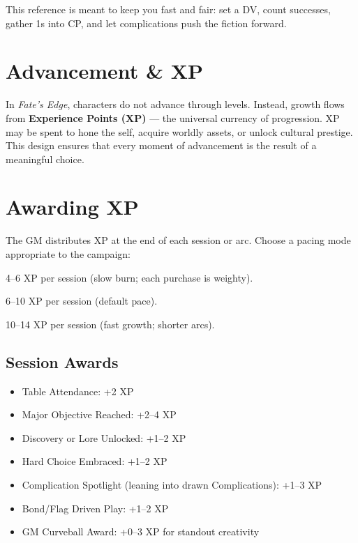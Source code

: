 \documentclass[12pt]{article}
\begin{document}
\bigskip
\noindent This reference is meant to keep you fast and fair: set a DV, count successes, gather 1s into CP, and let complications push the fiction forward.

\section{Advancement \& XP}

In \textit{Fate’s Edge}, characters do not advance through levels. 
Instead, growth flows from \textbf{Experience Points (XP)} --- the universal currency of progression. 
XP may be spent to hone the self, acquire worldly assets, or unlock cultural prestige. 
This design ensures that every moment of advancement is the result of a meaningful choice.

\section{Awarding XP}

The GM distributes XP at the end of each session or arc. 
Choose a pacing mode appropriate to the campaign:

\begin{description}[leftmargin=2cm]
  \item[Gritty:] 4--6 XP per session (slow burn; each purchase is weighty).  
  \item[Standard:] 6--10 XP per session (default pace).  
  \item[Heroic:] 10--14 XP per session (fast growth; shorter arcs).  
\end{description}

\subsection*{Session Awards}
\begin{itemize}
  \item Table Attendance: +2 XP  
  \item Major Objective Reached: +2--4 XP  
  \item Discovery or Lore Unlocked: +1--2 XP  
  \item Hard Choice Embraced: +1--2 XP  
  \item Complication Spotlight (leaning into drawn Complications): +1--3 XP  
  \item Bond/Flag Driven Play: +1--2 XP  
  \item GM Curveball Award: +0--3 XP for standout creativity  
\end{itemize}
\end{document}
